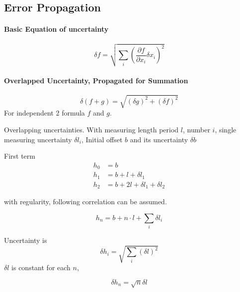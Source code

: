 \documentclass[]{article}
\begin{document}
\subsection{Error Propagation}

\paragraph{Basic Equation of uncertainty}
\begin{equation}
\delta f = \sqrt{\sum_i\left(\frac{\partial f}{\partial x_i} \delta x_i \right)^2}
\end{equation}

\paragraph{Overlapped Uncertainty, Propagated for Summation}

\begin{equation}
\delta (f+g) = \sqrt{(\delta g)^2 + (\delta f)^2  }
\end{equation}
For independent 2 formula $f$ and $g$.

Overlapping uncertainties. With measuring length period $l$, number $i$, single measuring uncertainty $\delta l_i$, Initial offset $b$ and its uncertainty $\delta b$

First term
\begin{align}
h_0 &= b \\
h_1 &= b + l + \delta l_1 \\
h_2 &= b + 2l +  \delta l_1 +\delta l_2
\end{align} 

with regularity, following correlation can be assumed.

\begin{equation}
h_n = b + n \cdot l + \sum_i{\delta l_i}
\end{equation}

Uncertainty is 
\begin{equation}
\delta h_i = \sqrt{\sum_i{\left(\delta l\right)^2}}
\end{equation}
$\delta l$ is constant for each $n$, 

\begin{equation}
\delta h_n = \sqrt{n} \delta l
\end{equation}



	
\end{document}
